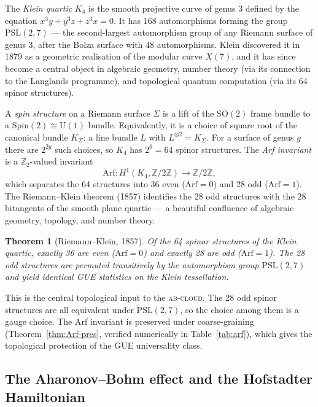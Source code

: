 \documentclass[11pt,a4paper]{article}
\theoremstyle{plain}
\newtheorem{theorem}{Theorem}[section]
\theoremstyle{definition}
\theoremstyle{remark}
\newcommand{\Abcloud}{\textsc{ab-cloud}}
\begin{document}
The \emph{Klein quartic} $K_4$ is the smooth projective curve of genus 3 defined by the equation $x^3 y + y^3 z + z^3 x = 0$. It has 168 automorphisms forming the group $\mathrm{PSL}(2,7)$ — the second-largest automorphism group of any Riemann surface of genus 3, after the Bolza surface with 48 automorphisms. Klein discovered it in 1879 as a geometric realisation of the modular curve $X(7)$, and it has since become a central object in algebraic geometry, number theory (via its connection to the Langlands programme), and topological quantum computation (via its 64 spinor structures).

A \emph{spin structure} on a Riemann surface $\Sigma$ is a lift of the $\mathrm{SO}(2)$ frame bundle to a $\mathrm{Spin}(2) \cong \mathrm{U}(1)$ bundle. Equivalently, it is a choice of square root of the canonical bundle $K_\Sigma$: a line bundle $L$ with $L^{\otimes 2} = K_\Sigma$. For a surface of genus $g$ there are $2^{2g}$ such choices, so $K_4$ has $2^6 = 64$ spinor structures. The \emph{Arf invariant} is a $\mathbb{Z}_2$-valued invariant
\begin{equation}
    \mathrm{Arf} : H^1(K_4, \mathbb{Z}/2\mathbb{Z}) \to \mathbb{Z}/2\mathbb{Z},
\end{equation}
which separates the 64 structures into 36 even ($\mathrm{Arf}=0$) and 28 odd ($\mathrm{Arf}=1$). The Riemann--Klein theorem (1857) identifies the 28 odd structures with the 28 bitangents of the smooth plane quartic — a beautiful confluence of algebraic geometry, topology, and number theory.

\begin{theorem}[Riemann--Klein, 1857]\label{thm:Arf}
Of the 64 spinor structures of the Klein quartic, exactly 36 are even ($\mathrm{Arf}=0$) and exactly 28 are odd ($\mathrm{Arf}=1$). The 28 odd structures are permuted transitively by the automorphism group $\mathrm{PSL}(2,7)$ and yield identical GUE statistics on the Klein tessellation.
\end{theorem}

This is the central topological input to the \Abcloud{}. The 28 odd spinor structures are all equivalent under $\mathrm{PSL}(2,7)$, so the choice among them is a gauge choice. The Arf invariant is preserved under coarse-graining (Theorem~\ref{thm:Arf-pres}, verified numerically in Table~\ref{tab:arf}), which gives the topological protection of the GUE universality class.

\subsection{The Aharonov--Bohm effect and the Hofstadter Hamiltonian}
\end{document}
